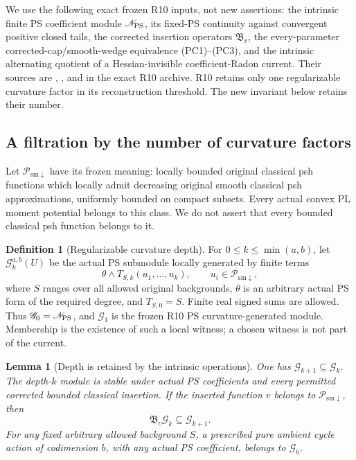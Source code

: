 \documentclass[11pt,a4paper]{article}
\numberwithin{equation}{section}
\newtheorem{lemma}[theorem]{Lemma}
\theoremstyle{definition}
\newtheorem{definition}[theorem]{Definition}
\theoremstyle{remark}
\begin{document}
We use the following exact frozen R10 inputs, not new assertions:
the intrinsic finite PS coefficient module $\mathscr N_{\rm PS}$,
its fixed-PS continuity against convergent positive closed tails,
the corrected insertion operators $\mathfrak B_v$, the every-parameter
corrected-cap/smooth-wedge equivalence (PC1)--(PC3), and the intrinsic
alternating quotient of a Hessian-invisible coefficient-Radon current.
Their sources are
,
, and
 in the exact
R10 archive. R10 retains only one regularizable curvature factor in
its reconstruction threshold. The new invariant below retains their
number.

\subsection{A filtration by the number of curvature factors}

Let $\mathcal P_{\mathrm{sm}\downarrow}$ have its frozen meaning:
locally bounded original classical psh functions which locally admit
decreasing original smooth classical psh approximations, uniformly
bounded on compact subsets. Every actual convex PL moment potential
belongs to this class. We do not assert that every bounded classical
psh function belongs to it.

\begin{definition}[Regularizable curvature depth]
\label{def:r12-curvature-depth}
For $0\le k\le\min(a,b)$, let
$\mathscr G_k^{a,b}(U)$ be the actual PS submodule locally generated
by finite terms
\[
       \theta\wedge T_{S,k}(u_1,\ldots,u_k),
       \qquad u_i\in\mathcal P_{\mathrm{sm}\downarrow},
 \tag{HD1}
\]
where $S$ ranges over all allowed original backgrounds, $\theta$ is
an arbitrary actual PS form of the required degree, and
$T_{S,0}=S$. Finite real signed sums are allowed. Thus
$\mathscr G_0=\mathscr N_{\rm PS}$, and $\mathscr G_1$ is the
frozen R10 PS curvature-generated module. Membership is the existence
of such a local witness; a chosen witness is not part of the current.
\end{definition}

\begin{lemma}[Depth is retained by the intrinsic operations]
\label{lem:r12-depth-operations}
One has $\mathscr G_{k+1}\subseteq\mathscr G_k$. The depth-$k$
module is stable under actual PS coefficients and every permitted
corrected bounded classical insertion. If the inserted function
$v$ belongs to $\mathcal P_{\mathrm{sm}\downarrow}$, then
\[
                    \mathfrak B_v\mathscr G_k
                                         \subseteq\mathscr G_{k+1}.
 \tag{HD2}
\]
For any fixed arbitrary allowed background $S$, a prescribed pure
ambient cycle action of codimension $b$, with any actual PS
coefficient, belongs to $\mathscr G_b$.
\end{lemma}
\end{document}
